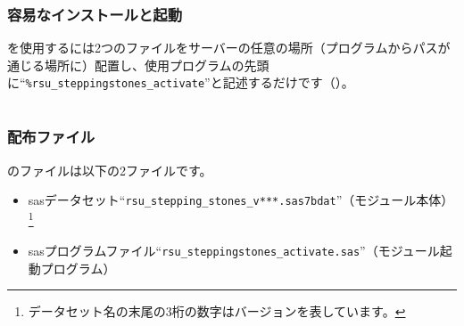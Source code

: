 \subsection{容易なインストールと起動}
\RDM を使用するには2つのファイルをサーバーの任意の場所（プログラムからパスが通じる場所に）配置し、\RDM 使用プログラムの先頭に``\texttt{\%rsu\_steppingstones\_activate}''と記述するだけです（）。
 
\chapter{\DocStrTitleRDMUsage}\label{chap:RDM_USAGE}
 
\section{\DocStrTitleRDMDeployment}
\subsection{配布ファイル}
\RDM のファイルは以下の2ファイルです。
\begin{itemize}
	\item sasデータセット``\texttt{rsu\_stepping\_stones\_v***.sas7bdat}''（モジュール本体）\footnote{データセット名の末尾の3桁の数字はバージョンを表しています。}
	\item sasプログラムファイル``\texttt{rsu\_steppingstones\_activate.sas}''（モジュール起動プログラム）
\end{itemize}
 
